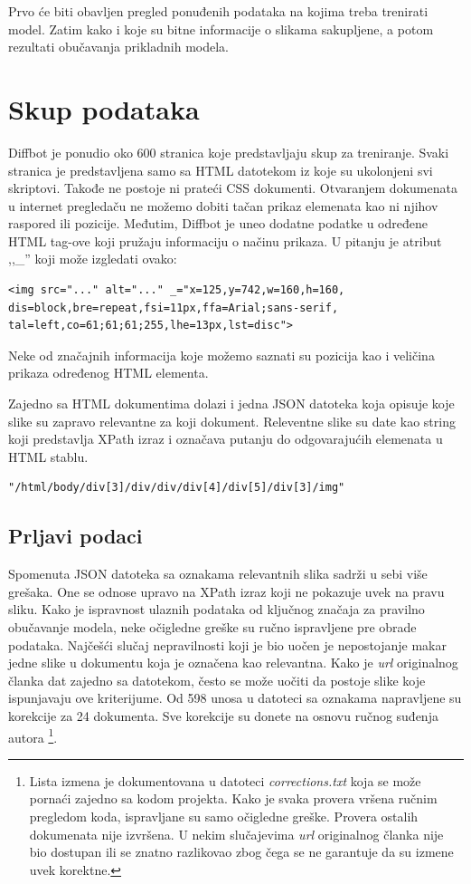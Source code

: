 \documentclass[a4paper]{article}
\begin{document}
Prvo će biti obavljen pregled ponuđenih podataka na kojima treba trenirati model. Zatim kako i koje su bitne informacije o slikama sakupljene, a potom rezultati obučavanja prikladnih modela. 
	
\section{Skup podataka}
\label{sec:podaci}

Diffbot je ponudio oko 600 stranica koje predstavljaju skup za treniranje. Svaki stranica je predstavljena samo sa HTML datotekom iz koje su ukolonjeni svi skriptovi. Takođe ne postoje ni prateći CSS dokumenti. Otvaranjem dokumenata u internet pregledaču ne možemo dobiti tačan prikaz elemenata kao ni njihov raspored ili pozicije. Međutim, Diffbot je uneo dodatne podatke u određene HTML tag-ove koji pružaju informaciju o načinu prikaza. U pitanju je atribut ,,\_'' koji može izgledati ovako:
	
\begin{lstlisting}
<img src="..." alt="..." _="x=125,y=742,w=160,h=160,
dis=block,bre=repeat,fsi=11px,ffa=Arial;sans-serif,
tal=left,co=61;61;61;255,lhe=13px,lst=disc">
\end{lstlisting}

Neke od značajnih informacija koje možemo saznati su pozicija kao i veličina prikaza određenog HTML elementa.

Zajedno sa HTML dokumentima dolazi i jedna JSON datoteka koja opisuje koje slike su zapravo relevantne za koji dokument. Releventne slike su date kao string koji predstavlja XPath izraz i označava putanju do odgovarajućih elemenata u HTML stablu.

\begin{lstlisting}
"/html/body/div[3]/div/div/div[4]/div[5]/div[3]/img"
\end{lstlisting}

\subsection{Prljavi podaci}
Spomenuta JSON datoteka sa oznakama relevantnih slika sadrži u sebi više grešaka. One se odnose upravo na XPath izraz koji ne pokazuje uvek na pravu sliku. Kako je ispravnost ulaznih podataka od ključnog značaja za pravilno obučavanje modela, neke očigledne greške su ručno ispravljene pre obrade podataka. Najčešći slučaj nepravilnosti koji je bio uočen je nepostojanje makar jedne slike u dokumentu koja je označena kao relevantna. Kako je \textit{url} originalnog članka dat zajedno sa datotekom, često se može uočiti da postoje slike koje ispunjavaju ove kriterijume. Od 598 unosa u datoteci sa oznakama napravljene su korekcije za 24 dokumenta. Sve korekcije su donete na osnovu ručnog suđenja autora \footnote{Lista izmena je dokumentovana u datoteci \textit{corrections.txt} koja se može pornaći zajedno sa kodom projekta. Kako je svaka provera vršena ručnim pregledom koda, ispravljane su samo očigledne greške. Provera ostalih dokumenata nije izvršena. U nekim slučajevima \textit{url} originalnog članka nije bio dostupan ili se znatno razlikovao zbog čega se ne garantuje da su izmene uvek korektne.}.  
\end{document}
